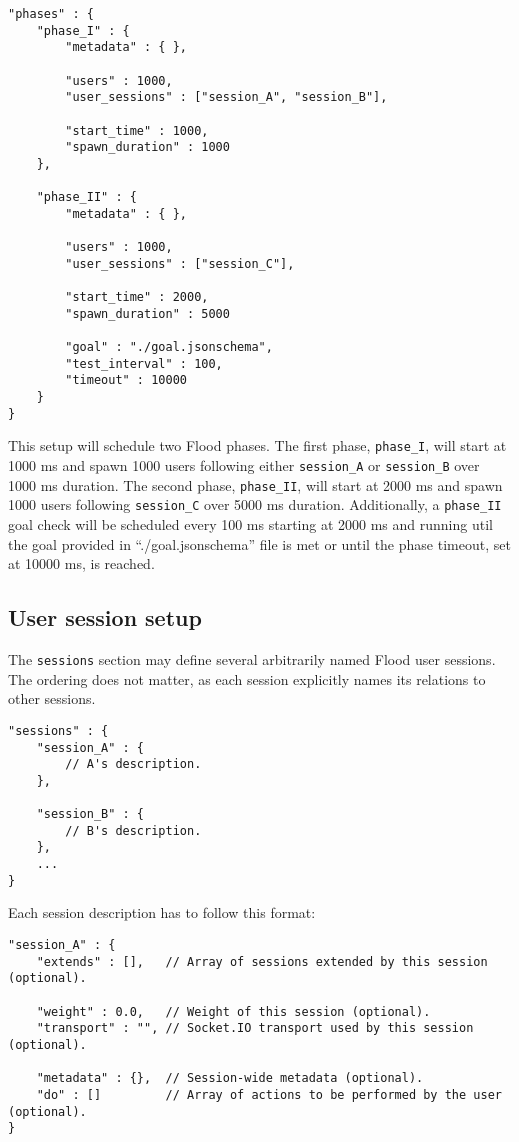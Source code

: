 \documentclass[a4paper]{article}
\begin{document}
\begin{verbatim}
"phases" : {
    "phase_I" : {
        "metadata" : { },

        "users" : 1000,
        "user_sessions" : ["session_A", "session_B"],

        "start_time" : 1000,
        "spawn_duration" : 1000
    },

    "phase_II" : {
        "metadata" : { },

        "users" : 1000,
        "user_sessions" : ["session_C"],

        "start_time" : 2000,
        "spawn_duration" : 5000

        "goal" : "./goal.jsonschema",
        "test_interval" : 100,
        "timeout" : 10000
    }
}
\end{verbatim}




\noindent
This setup will schedule two Flood phases. The first phase, \texttt{phase\_I}, will start at 1000 ms and spawn 1000 users following either \texttt{session\_A} or \texttt{session\_B} over 1000 ms duration. The second phase, \texttt{phase\_II}, will start at 2000 ms and spawn 1000 users following \texttt{session\_C} over 5000 ms duration. Additionally, a \texttt{phase\_II} goal check will be scheduled every 100 ms starting at 2000 ms and running util the goal provided in ``./goal.jsonschema'' file is met or until the phase timeout, set at 10000 ms, is reached.
\subsection{User session setup}
\label{sec-3-4}
\label{ref-session_setup}


The \texttt{sessions} section may define several arbitrarily named Flood user sessions. The ordering does not matter, as each session explicitly names its relations to other sessions.


\begin{verbatim}
"sessions" : {
    "session_A" : {
        // A's description.
    },

    "session_B" : {
        // B's description.
    },
    ...
}
\end{verbatim}




\noindent
Each session description has to follow this format:


\begin{verbatim}
"session_A" : {
    "extends" : [],   // Array of sessions extended by this session (optional).

    "weight" : 0.0,   // Weight of this session (optional).
    "transport" : "", // Socket.IO transport used by this session (optional).

    "metadata" : {},  // Session-wide metadata (optional).
    "do" : []         // Array of actions to be performed by the user (optional).
}
\end{verbatim}
\end{document}

